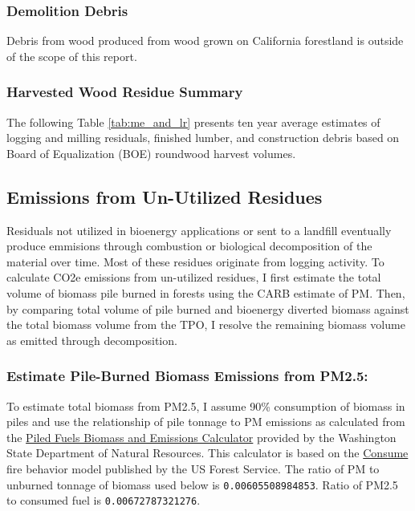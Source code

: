 \documentclass[a4paper]{article}
\begin{document}
\subsubsection{Demolition Debris}
\label{sec:orgheadline11}
Debris from wood produced from wood grown on California forestland is outside of the scope of this report.

\subsubsection{Harvested Wood Residue Summary}
\label{sec:orgheadline12}
The following Table \ref{tab:me_and_lr} presents ten year average estimates of logging and milling residuals, finished lumber, and construction debris based on Board of Equalization (BOE) roundwood harvest volumes.

\subsection{Emissions from Un-Utilized Residues}
\label{sec:orgheadline16}
\label{sec:boe_lr_emiss}

Residuals not utilized in bioenergy applications or sent to a landfill eventually 
produce emmisions through combustion or biological decomposition of the
material over time. Most of these residues originate from logging activity.  
To calculate \ac{CO2e} emissions from un-utilized residues, I first estimate the total volume of biomass 
pile burned in forests using the CARB estimate of PM. Then, by comparing total volume of pile burned and bioenergy diverted biomass against the 
total biomass volume from the \ac{TPO}, I resolve the remaining biomass volume as emitted through decomposition.  

\subsubsection{Estimate Pile-Burned Biomass Emissions from PM2.5:}
\label{sec:orgheadline14}

To estimate total biomass from PM2.5, I assume 90\% consumption of biomass in piles and use the relationship of pile tonnage to PM emissions as calculated from the \href{http://depts.washington.edu/nwfire/piles/}{Piled Fuels Biomass and Emissions Calculator} provided by the Washington State Department of Natural Resources. This calculator is based on the \href{http://www.fs.fed.us/pnw/fera/research/smoke/consume/index.shtml}{Consume} fire behavior model published by the US Forest Service. The ratio of PM to unburned tonnage of biomass used below is \texttt{0.00605508984853}. Ratio of PM2.5 to consumed fuel is \texttt{0.00672787321276}.
\end{document}
